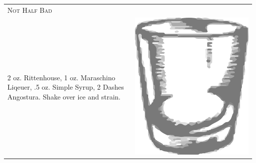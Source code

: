 \documentclass{article}
\begin{document}
\begin{multicols}{2}
\begin{tabular}{p{2in} p{0.5in}}
\multicolumn{2}{p{3in}}{\centering\Huge\textsc{Not Half Bad}} \\ 
   \vspace{-0.1in}2 oz. Rittenhouse, 1 oz. Maraschino Liqeuer, .5 oz. Simple Syrup, 2 Dashes Angostura. Shake over ice and strain. &
   \vspace{-0.1in} \includegraphics{rocks_glass.png}
\end{tabular}


\end{multicols}
\end{document}
